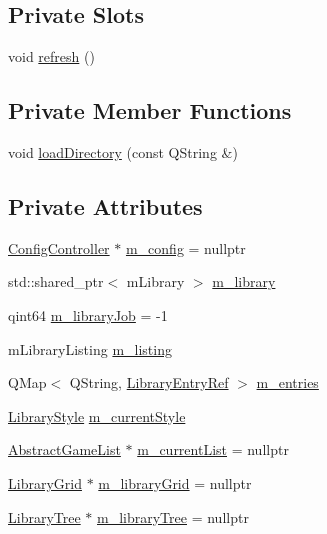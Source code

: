 \subsection*{Private Slots}
\begin{DoxyCompactItemize}
\item 
void \mbox{\hyperlink{class_q_g_b_a_1_1_library_controller_a41b89cf89ef004789161172657410379}{refresh}} ()
\end{DoxyCompactItemize}
\subsection*{Private Member Functions}
\begin{DoxyCompactItemize}
\item 
void \mbox{\hyperlink{class_q_g_b_a_1_1_library_controller_a39fcdba5deb72ca89a3d26cc967a62a6}{load\+Directory}} (const Q\+String \&)
\end{DoxyCompactItemize}
\subsection*{Private Attributes}
\begin{DoxyCompactItemize}
\item 
\mbox{\hyperlink{class_q_g_b_a_1_1_config_controller}{Config\+Controller}} $\ast$ \mbox{\hyperlink{class_q_g_b_a_1_1_library_controller_a202998e646d739275d3edc1f85e60037}{m\+\_\+config}} = nullptr
\item 
std\+::shared\+\_\+ptr$<$ m\+Library $>$ \mbox{\hyperlink{class_q_g_b_a_1_1_library_controller_a2907849f816d93078ebad93c4a899cf4}{m\+\_\+library}}
\item 
qint64 \mbox{\hyperlink{class_q_g_b_a_1_1_library_controller_a181b0ecf75af5d024e7e7fa4ee8a0111}{m\+\_\+library\+Job}} = -\/1
\item 
m\+Library\+Listing \mbox{\hyperlink{class_q_g_b_a_1_1_library_controller_af92b619ecb1b255a005264d98f5e5774}{m\+\_\+listing}}
\item 
Q\+Map$<$ Q\+String, \mbox{\hyperlink{namespace_q_g_b_a_a201fa9f2cb8f778666a134ba81909358}{Library\+Entry\+Ref}} $>$ \mbox{\hyperlink{class_q_g_b_a_1_1_library_controller_a8bfbc85d68cca4fe2cab1d5e8e4dca51}{m\+\_\+entries}}
\item 
\mbox{\hyperlink{namespace_q_g_b_a_a4804d48d02699a2c1d2436e9269a8bb8}{Library\+Style}} \mbox{\hyperlink{class_q_g_b_a_1_1_library_controller_ad063b193fb4825cca9fdb8aa2fdf0be6}{m\+\_\+current\+Style}}
\item 
\mbox{\hyperlink{class_q_g_b_a_1_1_abstract_game_list}{Abstract\+Game\+List}} $\ast$ \mbox{\hyperlink{class_q_g_b_a_1_1_library_controller_ab01f2f8a1d2f19a9f189100be180bc28}{m\+\_\+current\+List}} = nullptr
\item 
\mbox{\hyperlink{class_q_g_b_a_1_1_library_grid}{Library\+Grid}} $\ast$ \mbox{\hyperlink{class_q_g_b_a_1_1_library_controller_a948133621a760d2ed0f5526fe1aaa50c}{m\+\_\+library\+Grid}} = nullptr
\item 
\mbox{\hyperlink{class_q_g_b_a_1_1_library_tree}{Library\+Tree}} $\ast$ \mbox{\hyperlink{class_q_g_b_a_1_1_library_controller_a5e5555572a4417f4b99315aa81eb931a}{m\+\_\+library\+Tree}} = nullptr
\end{DoxyCompactItemize}


